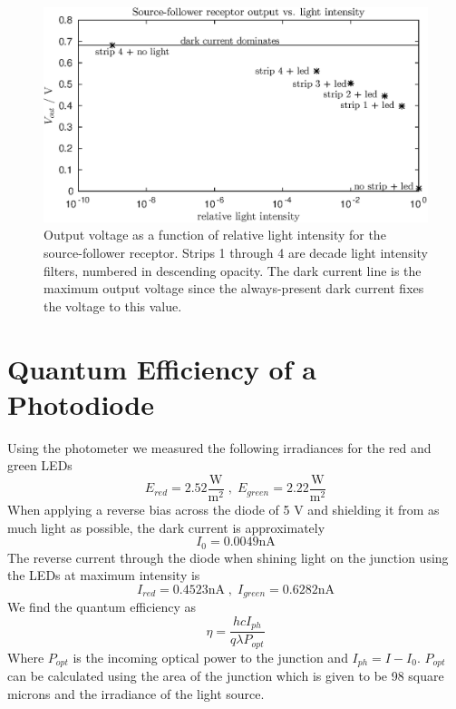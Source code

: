 

\newcommand{\reffig}[1]{Fig.~\ref{#1}}



\newpage
\begin{figure}
    \center
    \includegraphics{srcfoll.eps}
    \caption{Output voltage as a function of relative light intensity for the source-follower receptor. Strips 1 through 4
    are decade light intensity filters, numbered in descending opacity. The dark current line is the maximum output voltage since
the always-present dark current fixes the voltage to this value.}
    \label{fig:srcfoll}
\end{figure}
\section{Quantum Efficiency of a Photodiode}
Using the photometer we measured the following irradiances for the red and green LEDs
\begin{equation*}
    E_{red} = 2.52 \frac{\mathrm{W}}{\mathrm{m}^2} \; ,\; E_{green} = 2.22 \frac{\mathrm{W}}{\mathrm{m}^2}
\end{equation*}
When applying a reverse bias across the diode of 5 V and shielding it from as much light as possible, the dark
current is approximately
\begin{equation*}
    I_0 = 0.0049 \mathrm{nA}
\end{equation*}
The reverse current through the diode when shining light on the junction using the LEDs at maximum intensity is
\begin{equation*}
    I_{red} = 0.4523 \mathrm{nA} \; , \; I_{green} = 0.6282 \mathrm{nA}
\end{equation*}
We find the quantum efficiency as
\begin{equation*}
    \eta = \frac{hc I_{ph}}{q\lambda P_{opt}}
\end{equation*}
Where \(P_{opt}\) is the incoming optical power to the junction and \(I_{ph} = I-I_0\). \(P_{opt}\) can be calculated using the area of the junction
which is given to be 98 square microns and the irradiance of the light source. 

